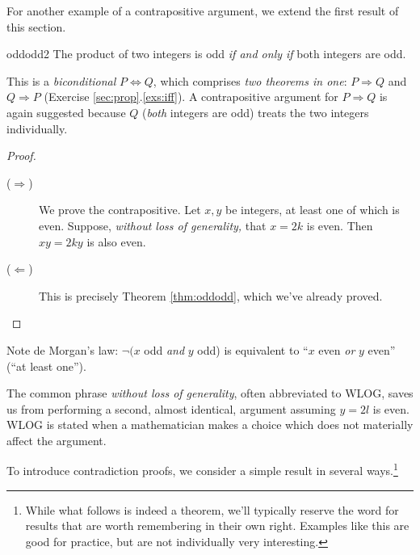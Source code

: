 \goodbreak


For another example of a contrapositive argument, we extend the first result of this section.

\begin{thm}{}{oddodd2}
	The product of two integers is odd \emph{if and only if} both integers are odd.
\end{thm}

This is a \emph{biconditional} $P\Longleftrightarrow Q$, which comprises \emph{two theorems in one}: $P\Longrightarrow Q$ and $Q\Longrightarrow P$ (Exercise \ref*{sec:prop}.\ref{exs:iff}). A contrapositive argument for $P\Longrightarrow Q$ is again suggested because $Q$ (\emph{both} integers are odd) treats the two integers individually.

\begin{proof}
	\begin{description}
		\item[\normalfont ($\Rightarrow$)] We prove the contrapositive. Let $x,y$ be integers, at least one of which is even. Suppose, \emph{without loss of generality,} that $x=2k$ is even. Then $xy=2ky$ is also even.
		\item[\normalfont ($\Leftarrow$)] This is precisely Theorem \ref{thm:oddodd}, which we've already proved.\qedhere
	\end{description}
\end{proof}

Note de Morgan's law: $\neg(x$ odd \emph{and} $y$ odd) is equivalent to ``$x$ even \emph{or} $y$ even'' (``at least one'').\par

The common phrase \emph{without loss of generality}, often abbreviated to WLOG, saves us from performing a second, almost identical, argument assuming $y=2l$ is even. WLOG is stated when a mathematician makes a choice which does not materially affect the argument.



To introduce contradiction proofs, we consider a simple result in several ways.\footnote{While what follows is indeed a theorem, we'll typically reserve the word for results that are worth remembering in their own right. Examples like this are good for practice, but are not individually very interesting.}



